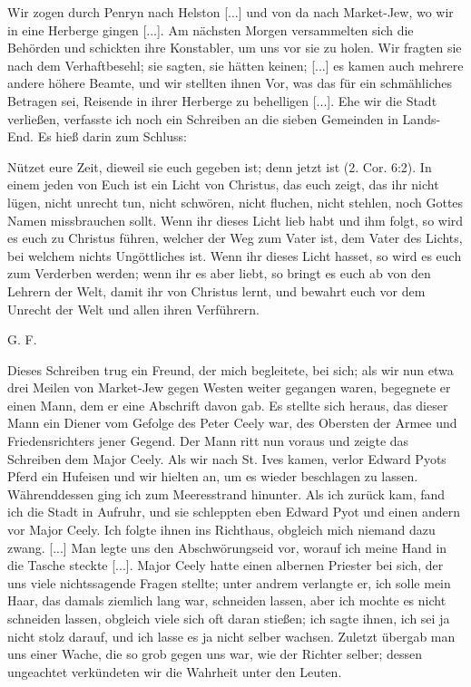 Wir zogen durch
Penryn nach Helston [...] und von da nach 
Market-Jew, wo
wir in eine Herberge gingen [...]. Am nächsten Morgen 
versammelten sich die Behörden und schickten ihre Konstabler, um
uns vor sie zu holen. Wir fragten sie nach dem Verhaftbesehl;
sie sagten, sie hätten keinen; [...] es kamen auch mehrere
andere höhere Beamte, und wir stellten ihnen Vor, was das für
ein schmähliches Betragen sei, Reisende in ihrer Herberge zu 
behelligen [...]. Ehe wir die Stadt verließen, verfasste ich noch
ein Schreiben an die sieben Gemeinden in Lands-End. Es hieß
darin zum Schluss: 


{

Nützet eure Zeit, dieweil sie euch gegeben
ist; denn jetzt ist  (2. Cor. 6:2). 
In einem jeden von Euch ist ein Licht
von Christus, das euch zeigt, das ihr nicht lügen, nicht unrecht
tun, nicht schwören, nicht fluchen, nicht stehlen, noch Gottes Namen
missbrauchen sollt. Wenn ihr dieses Licht lieb habt und ihm
folgt, so wird es euch zu Christus führen, welcher der Weg zum
Vater ist, dem Vater des Lichts, bei welchem nichts Ungöttliches
ist. Wenn ihr dieses Licht hasset, so wird es euch zum Verderben 
werden; wenn ihr es aber liebt, so bringt es euch ab von
den Lehrern der Welt, damit ihr von Christus lernt, und 
bewahrt euch vor dem Unrecht der Welt und allen ihren 
Verführern. 

\bigskip

\begin{flushright}
G. F.\end{flushright}

}

Dieses Schreiben trug ein Freund, der mich begleitete, bei
sich; als wir nun etwa drei Meilen von Market-Jew gegen
Westen weiter gegangen waren, begegnete er einen Mann, dem
er eine Abschrift davon gab. Es stellte sich heraus, das dieser
Mann ein Diener vom Gefolge des Peter 
Ceely war, des
Obersten der Armee und Friedensrichters jener Gegend. Der Mann
ritt nun voraus und zeigte das Schreiben dem Major Ceely. Als
wir nach St. Ives kamen, verlor Edward 
Pyots Pferd ein Hufeisen
und wir hielten an, um es wieder beschlagen zu lassen. 
Währenddessen ging ich zum Meeresstrand hinunter. Als ich zurück kam,
fand ich die Stadt in Aufruhr, und sie schleppten eben Edward
Pyot und einen andern vor Major Ceely. Ich folgte ihnen ins
Richthaus, obgleich mich niemand dazu zwang. [...] Man
legte uns den Abschwörungseid vor, worauf ich meine Hand in
die Tasche steckte [...]. Major Ceely hatte einen albernen
Priester bei sich, der uns viele nichtssagende Fragen stellte; unter
andrem verlangte er, ich solle mein Haar, das damals ziemlich
lang war, 
schneiden lassen, aber ich mochte es nicht schneiden
lassen, obgleich viele sich oft daran stießen; ich sagte ihnen, ich
sei ja nicht stolz darauf, und ich lasse es ja nicht selber wachsen.
Zuletzt übergab man uns einer Wache, die so grob gegen uns
war, wie der Richter selber; dessen ungeachtet verkündeten wir
die Wahrheit unter den Leuten. 


